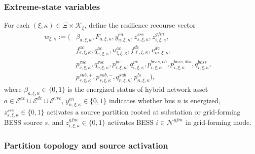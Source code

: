 \subsubsection{Extreme-state variables}

For each \((\xi,\kappa)\in\Xi\times\mathcal{K}_\xi\), define the resilience recourse vector
\begin{align}
w_{\xi,\kappa} := \Big(
&\beta_{a,\xi,\kappa},F_{a,\xi,\kappa},y_{n,\xi,\kappa}^{en},z_{s,\xi,\kappa}^{src},z_{i,\xi,\kappa}^{gfm}, \\
&f_{e,\xi,\kappa}^{ac},q_{e,\xi,\kappa}^{ac},u_{i,\xi,\kappa}^{ac},
f_{\ell,\xi,\kappa}^{dc},v_{m,\xi,\kappa}^{dc}, \\
&p_{c,\xi,\kappa}^{vsc},q_{c,\xi,\kappa}^{vsc},
p_{i,\xi,\kappa}^{pv},q_{i,\xi,\kappa}^{pv},
p_{i,\xi,\kappa}^{bess,ch},p_{i,\xi,\kappa}^{bess,dis},q_{i,\xi,\kappa}^{bess}, \\
&p_{r,\xi,\kappa}^{sub,+},p_{r,\xi,\kappa}^{sub,-},q_{r,\xi,\kappa}^{sub},
p_{n,\xi,\kappa}^{ls}
\Big),
\end{align}
where \(\beta_{a,\xi,\kappa}\in\{0,1\}\) is the energized status of hybrid network asset \(a\in\mathcal{E}^{ac}\cup\mathcal{E}^{dc}\cup\mathcal{E}^{vsc}\), \(y_{n,\xi,\kappa}^{en}\in\{0,1\}\) indicates whether bus \(n\) is energized, \(z_{s,\xi,\kappa}^{src}\in\{0,1\}\) activates a source partition rooted at substation or grid-forming BESS source \(s\), and \(z_{i,\xi,\kappa}^{gfm}\in\{0,1\}\) activates BESS \(i\in\mathcal{N}^{gfm}\) in grid-forming mode.

\subsubsection{Partition topology and source activation}

